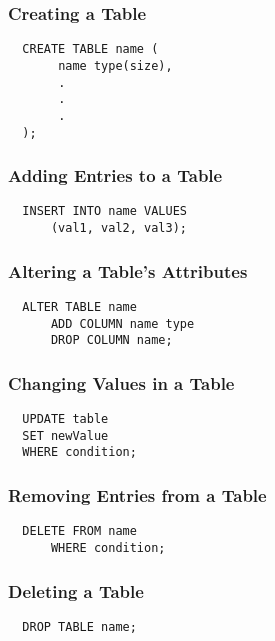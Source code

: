\documentclass{article}
\begin{document}
\subsubsection*{Creating a Table}

\begin{lstlisting}
  CREATE TABLE name (
       name type(size),
       .
       .
       .
  );
\end{lstlisting}

\subsubsection*{Adding Entries to a Table}

\begin{lstlisting}
  INSERT INTO name VALUES
      (val1, val2, val3);
\end{lstlisting}

\subsubsection*{Altering a Table's Attributes}

\begin{lstlisting}
  ALTER TABLE name
      ADD COLUMN name type
      DROP COLUMN name;
\end{lstlisting}

\subsubsection*{Changing Values in a Table}

\begin{lstlisting}
  UPDATE table
  SET newValue
  WHERE condition;
\end{lstlisting}

\subsubsection*{Removing Entries from a Table}

\begin{lstlisting}
  DELETE FROM name
      WHERE condition;
\end{lstlisting}

\subsubsection*{Deleting a Table}

\begin{lstlisting}
  DROP TABLE name;
\end{lstlisting}
\end{document}
